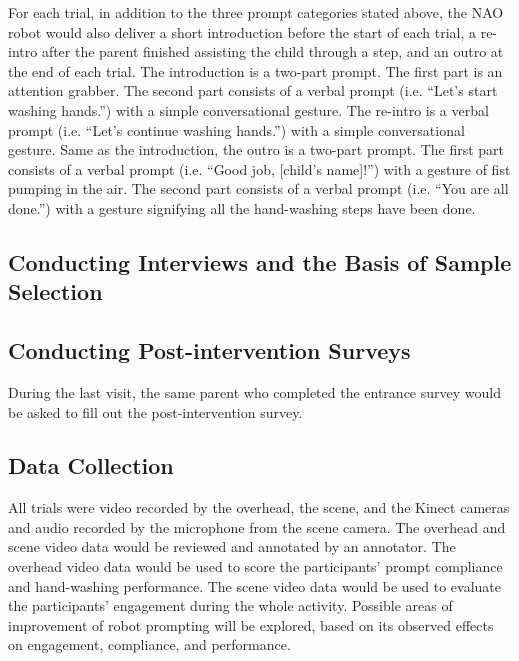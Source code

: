 For each trial, in addition to the three prompt categories stated above, the NAO robot would also deliver a short introduction before the start of each trial, a re-intro after the parent finished assisting the child through a step, and an outro at the end of each trial. The introduction is a two-part prompt. The first part is an attention grabber. The second part consists of a verbal prompt (i.e. “Let's start washing hands.”) with a simple conversational gesture. The re-intro is a verbal prompt (i.e. “Let's continue washing hands.”) with a simple conversational gesture. Same as the introduction, the outro is a two-part prompt. The first part consists of a verbal prompt (i.e. “Good job, [child's name]!”) with a gesture of fist pumping in the air. The second part consists of a verbal prompt (i.e. “You are all done.”) with a gesture signifying all the hand-washing steps have been done.

\subsection{Conducting Interviews and the Basis of Sample Selection}
\label{sec:ConductingInterviews}



\subsection{Conducting Post-intervention Surveys}
During the last visit, the same parent who completed the entrance survey would be asked to fill out the post-intervention survey.

\subsection{Data Collection}
All trials were video recorded by the overhead, the scene, and the Kinect cameras and audio recorded by the microphone from the scene camera.  The overhead and scene video data would be reviewed and annotated by an annotator. The overhead video data would be used to score the participants' prompt compliance and hand-washing performance. The scene video data would be used to evaluate the participants' engagement during the whole activity. Possible areas of improvement of robot prompting will be explored, based on its observed effects on engagement, compliance, and performance.

